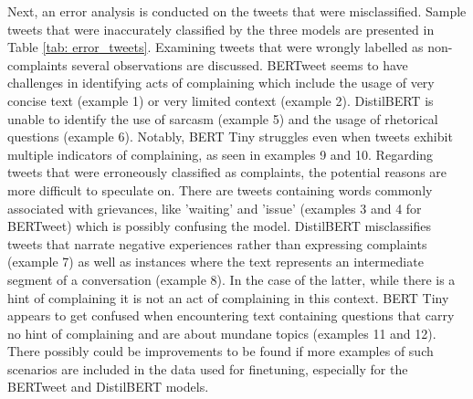 Next, an error analysis is conducted on the tweets that were misclassified. Sample tweets that were inaccurately classified by the three models are presented in Table \ref{tab: error_tweets}. Examining tweets that were wrongly labelled as non-complaints several observations are discussed. BERTweet seems to have challenges in identifying acts of complaining which include the usage of very concise text (example 1) or very limited context (example 2). DistilBERT is unable to identify the use of sarcasm (example 5) and the usage of rhetorical questions (example 6). Notably, BERT Tiny struggles even when tweets exhibit multiple indicators of complaining, as seen in examples 9 and 10. Regarding tweets that were erroneously classified as complaints, the potential reasons are more difficult to speculate on. There are tweets containing words commonly associated with grievances, like 'waiting' and 'issue' (examples 3 and 4 for BERTweet) which is possibly confusing the model. DistilBERT misclassifies tweets that narrate negative experiences rather than expressing complaints (example 7) as well as instances where the text represents an intermediate segment of a conversation (example 8). In the case of the latter, while there is a hint of complaining it is not an act of complaining in this context. BERT Tiny appears to get confused when encountering text containing questions that carry no hint of complaining and are about mundane topics (examples 11 and 12). There possibly could be improvements to be found if more examples of such scenarios are included in the data used for finetuning, especially for the BERTweet and DistilBERT models. 

